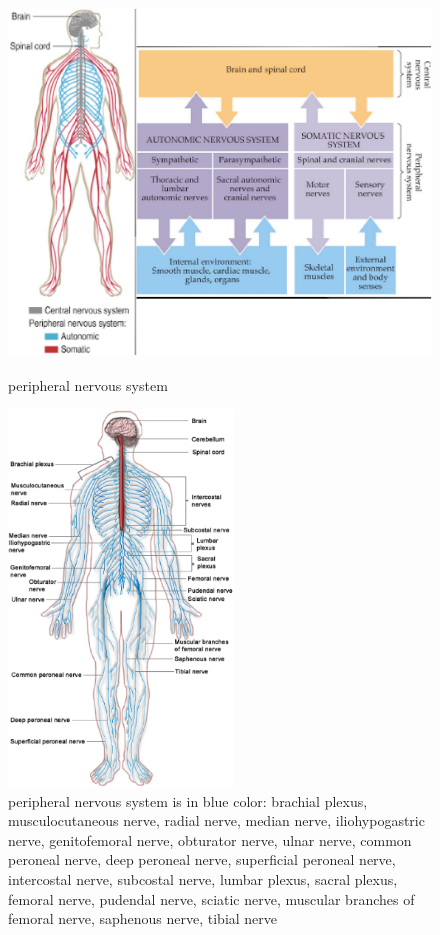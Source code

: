 
\begin{figure}[hbt]
  \centerline{
\includegraphics[height=10cm,
    angle=0]{./images/PNS_explain.eps}
    }
\caption{peripheral nervous system}
\label{fig:pns}
\end{figure}



\begin{figure}[hbt]
  \centerline{
  \includegraphics[height=10cm,
    angle=0]{./images/PNS.eps}}
\caption{peripheral nervous system is in blue color: brachial plexus,
musculocutaneous nerve, radial nerve, 
median nerve, iliohypogastric nerve, genitofemoral nerve, obturator nerve,
ulnar nerve, common peroneal nerve, deep peroneal nerve, superficial peroneal
nerve, intercostal nerve, subcostal nerve, lumbar plexus, sacral plexus,
femoral nerve, pudendal nerve, sciatic nerve, muscular branches of femoral
nerve, saphenous nerve, tibial nerve}
\label{fig:pns_detail}
\end{figure}




